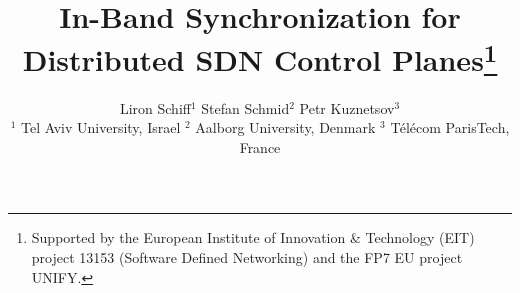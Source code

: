 \documentclass[conference]{sigcomm-alternate}
\begin{document}
\sloppy





\title{In-Band Synchronization for\\Distributed SDN Control Planes\thanks{Supported by the
European Institute of Innovation \& Technology (EIT) project 13153 (Software Defined Networking) 
and the FP7 EU project UNIFY.}}




\author{
Liron Schiff$^1$  \quad %
Stefan Schmid$^2$ \quad Petr Kuznetsov$^3$ \\
\small $^1$ Tel Aviv University, Israel \quad $^2$ Aalborg University,
Denmark \quad $^3$ T\'el\'ecom ParisTech, France
}


\date{}


\maketitle


\thispagestyle{empty}
\end{document}
